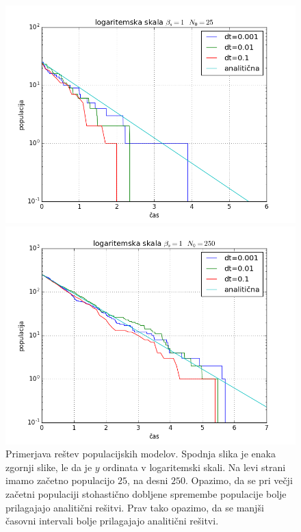 \documentclass[slovene,11pt,a4paper]{article}
\numberwithin{equation}{section} %
\numberwithin{figure}{section} %
\numberwithin{table}{section} %
\begin{document}
\begin{figure}[h]
\begin{minipage}{0.5\textwidth}
\includegraphics[scale=0.45]{slike/populacija_umiranje_preprosto_25_log.png}
\end{minipage}\hfill
\begin{minipage}{0.5\textwidth}
\centering
\includegraphics[scale=0.45]{slike/populacija_umiranje_preprosto_250_log.png}
\end{minipage}
\caption{Primerjava reštev populacijskih modelov. Spodnja slika je enaka zgornji slike, le da je $y$ ordinata v logaritemski skali. Na levi strani imamo začetno populacijo $25$, na desni $250$. Opazimo, da se pri večji začetni populaciji stohastično dobljene spremembe populacije bolje prilagajajo analitični rešitvi. Prav tako opazimo, da se manjši časovni intervali bolje prilagajajo analitični rešitvi. }
\end{figure}
\end{document}
